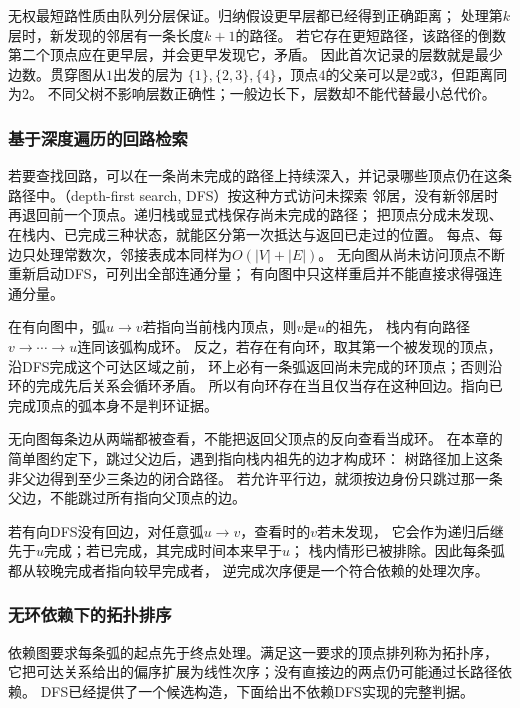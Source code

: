 无权最短路性质由队列分层保证。归纳假设更早层都已经得到正确距离；
处理第\(k\)层时，新发现的邻居有一条长度\(k+1\)的路径。
若它存在更短路径，该路径的倒数第二个顶点应在更早层，并会更早发现它，矛盾。
因此首次记录的层数就是最少边数。贯穿图从\(1\)出发的层为
\(\{1\},\{2,3\},\{4\}\)，顶点\(4\)的父亲可以是\(2\)或\(3\)，但距离同为\(2\)。
不同父树不影响层数正确性；一般边长下，层数却不能代替最小总代价。

\subsubsection{基于深度遍历的回路检索}
\label{sec:graph-theory-dfs}

若要查找回路，可以在一条尚未完成的路径上持续深入，并记录哪些顶点仍在这条
路径中。（depth-first search, DFS）按这种方式访问未探索
邻居，没有新邻居时再退回前一个顶点。递归栈或显式栈保存尚未完成的路径；
把顶点分成未发现、在栈内、已完成三种状态，就能区分第一次抵达与返回已走过的位置。
每点、每边只处理常数次，邻接表成本同样为\(O(|V|+|E|)\)。
无向图从尚未访问顶点不断重新启动DFS，可列出全部连通分量；
有向图中只这样重启并不能直接求得强连通分量。

在有向图中，弧\(u\to v\)若指向当前栈内顶点，则\(v\)是\(u\)的祖先，
栈内有向路径\(v\to\cdots\to u\)连同该弧构成环。
反之，若存在有向环，取其第一个被发现的顶点，沿DFS完成这个可达区域之前，
环上必有一条弧返回尚未完成的环顶点；否则沿环的完成先后关系会循环矛盾。
所以有向环存在当且仅当存在这种回边。指向已完成顶点的弧本身不是判环证据。

无向图每条边从两端都被查看，不能把返回父顶点的反向查看当成环。
在本章的简单图约定下，跳过父边后，遇到指向栈内祖先的边才构成环：
树路径加上这条非父边得到至少三条边的闭合路径。
若允许平行边，就须按边身份只跳过那一条父边，不能跳过所有指向父顶点的边。

若有向DFS没有回边，对任意弧\(u\to v\)，查看时的\(v\)若未发现，
它会作为递归后继先于\(u\)完成；若已完成，其完成时间本来早于\(u\)；
栈内情形已被排除。因此每条弧都从较晚完成者指向较早完成者，
逆完成次序便是一个符合依赖的处理次序。

\subsubsection{无环依赖下的拓扑排序}
\label{sec:graph-theory-topological-order}

依赖图要求每条弧的起点先于终点处理。满足这一要求的顶点排列称为拓扑序，
它把可达关系给出的偏序扩展为线性次序；没有直接边的两点仍可能通过长路径依赖。
DFS已经提供了一个候选构造，下面给出不依赖DFS实现的完整判据。

